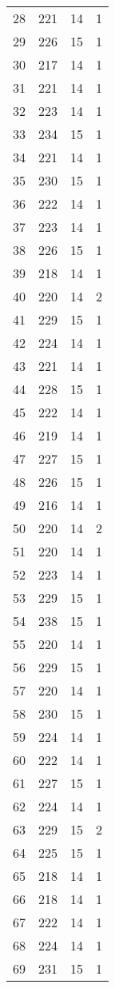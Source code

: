 \begin{longtable}[!]{c|ccc}
	28	& 221	& 14	& 1	\\
	29	& 226	& 15	& 1	\\
	30	& 217	& 14	& 1	\\
	31	& 221	& 14	& 1	\\
	32	& 223	& 14	& 1	\\
	33	& 234	& 15	& 1	\\
	34	& 221	& 14	& 1	\\
	35	& 230	& 15	& 1	\\
	36	& 222	& 14	& 1	\\
	37	& 223	& 14	& 1	\\
	38	& 226	& 15	& 1	\\
	39	& 218	& 14	& 1	\\
	40	& 220	& 14	& 2	\\
	41	& 229	& 15	& 1	\\
	42	& 224	& 14	& 1	\\
	43	& 221	& 14	& 1	\\
	44	& 228	& 15	& 1	\\
	45	& 222	& 14	& 1	\\
	46	& 219	& 14	& 1	\\
	47	& 227	& 15	& 1	\\
	48	& 226	& 15	& 1	\\
	49	& 216	& 14	& 1	\\
	50	& 220	& 14	& 2	\\
	51	& 220	& 14	& 1	\\
	52	& 223	& 14	& 1	\\
	53	& 229	& 15	& 1	\\
	54	& 238	& 15	& 1	\\
	55	& 220	& 14	& 1	\\
	56	& 229	& 15	& 1	\\
	57	& 220	& 14	& 1	\\
	58	& 230	& 15	& 1	\\
	59	& 224	& 14	& 1	\\
	60	& 222	& 14	& 1	\\
	61	& 227	& 15	& 1	\\
	62	& 224	& 14	& 1	\\
	63	& 229	& 15	& 2	\\
	64	& 225	& 15	& 1	\\
	65	& 218	& 14	& 1	\\
	66	& 218	& 14	& 1	\\
	67	& 222	& 14	& 1	\\
	68	& 224	& 14	& 1	\\
	69	& 231	& 15	& 1	\\

\end{longtable}
